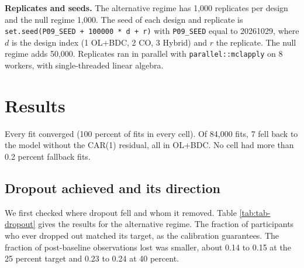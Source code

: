\documentclass[
  11pt,
]{article}
\begin{document}
\textbf{Replicates and seeds.} The alternative regime has
1,000
replicates per design and the null regime
1,000. The seed of each
design and replicate is \texttt{set.seed(P09\_SEED\ +\ 100000\ *\ d\ +\ r)} with
\texttt{P09\_SEED} equal to 20261029, where \(d\) is the design index (1 OL+BDC, 2 CO, 3 Hybrid) and \(r\) the
replicate. The null regime adds 50,000. Replicates ran in parallel with
\texttt{parallel::mclapply} on 8 workers, with single-threaded
linear algebra.

\section{Results}\label{sec-results}

Every fit converged
(100 percent of fits in every cell).
Of 84,000 fits, 7 fell back to the model without
the CAR(1) residual, all in
OL+BDC. No cell had more than
0.2 percent fallback fits.

\subsection{Dropout achieved and its direction}\label{sec-dropout-achieved}

We first checked where dropout fell and whom it removed. Table
\ref{tab:tab-dropout} gives the results for the alternative regime.
The fraction of participants who ever dropped out matched its target,
as the calibration guarantees. The fraction of post-baseline
observations lost was smaller, about
0.14
to
0.15
at the 25 percent target and
0.23 to
0.24 at 40
percent.
\end{document}
